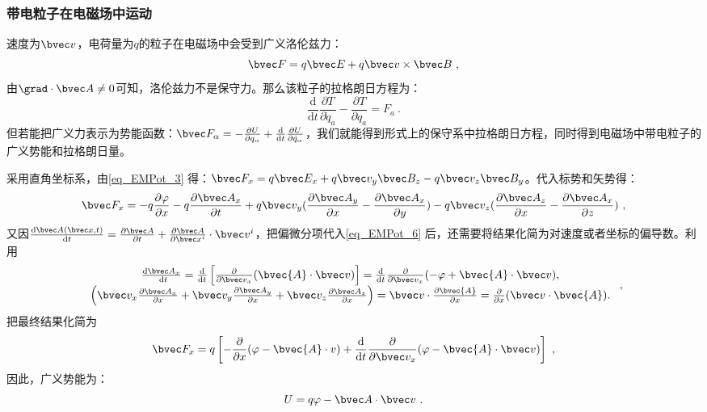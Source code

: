 \subsubsection{带电粒子在电磁场中运动}
速度为$\bvec v$，电荷量为$q$的粒子在电磁场中会受到广义洛伦兹力：
\begin{equation}\label{eq_EMPot_3}
\bvec F=q\bvec E+q\bvec v \times \bvec B
~,\end{equation}
由$\grad \cdot \bvec A\neq 0$可知，洛伦兹力不是保守力。那么该粒子的拉格朗日方程为：
\begin{equation}
\frac{\mathrm{d}}{\mathrm{d} t} \frac{\partial T}{\partial \dot{q}_a}-\frac{\partial T}{\partial q_a}=F_a~.
\end{equation}
但若能把广义力表示为势能函数：$\bvec F_{\alpha}=-\frac{\partial U}{\partial q_{\alpha}}+\frac{\mathrm{d}}{\mathrm{d}t}\frac{\partial U}{\partial \dot q_{\alpha}}$，我们就能得到形式上的保守系中拉格朗日方程，同时得到电磁场中带电粒子的广义势能和拉格朗日量。

采用直角坐标系，由\autoref{eq_EMPot_3} 得：$\bvec F_x=q\bvec E_x+q\bvec v_y\bvec B_z-q\bvec v_z\bvec B_y$。代入标势和矢势得：
\begin{equation}\label{eq_EMPot_6}
\bvec F_x=-q\frac{\partial \varphi}{\partial x}-q\frac{\partial \bvec A_x}{\partial t}+q\bvec v_y(\frac{\partial \bvec A_y}{\partial x}-\frac{\partial \bvec A_x}{\partial y})-q\bvec v_z(\frac{\partial \bvec A_z}{\partial x}-\frac{\partial \bvec A_x}{\partial z})~,
\end{equation}
又因$\frac{\mathrm{d}\bvec A(\bvec x,t)}{\mathrm{d}t}=\frac{\partial \bvec A}{\partial t}+\frac{\partial \bvec A}{\partial \bvec x^i}\cdot \bvec v^i$，把偏微分项代入\autoref{eq_EMPot_6} 后，还需要将结果化简为对速度或者坐标的偏导数。利用
\begin{equation}
\begin{array}{c}
\frac{\mathrm{d} \bvec A_x}{\mathrm{~d} t}=\frac{\mathrm{d}}{\mathrm{d} t}\left[\frac{\partial}{\partial \bvec v_x}(\bvec {A} \cdot \bvec v)\right]=\frac{\mathrm{d}}{\mathrm{d} t} \frac{\partial}{\partial \bvec v_x}(-\varphi+\bvec {A} \cdot \bvec v), \\
\left(\bvec v_x \frac{\partial \bvec A_x}{\partial x}+\bvec v_y \frac{\partial \bvec A_y}{\partial x}+\bvec v_z \frac{\partial \bvec A_z}{\partial x}\right)=\bvec v \cdot \frac{\partial \bvec {A}}{\partial x}=\frac{\partial}{\partial x}(\bvec v \cdot \bvec {A}) .
\end{array}~,
\end{equation}
把最终结果化简为
\begin{equation}
\bvec F_x=q\left[-\frac{\partial}{\partial x}(\varphi-\bvec {A} \cdot v)+\frac{\mathrm{d}}{\mathrm{d} t} \frac{\partial}{\partial \bvec v_x}(\varphi-\bvec {A} \cdot \bvec v)\right]~,
\end{equation}
因此，广义势能为：
\begin{equation}
U=q\varphi -\bvec A\cdot \bvec v~.
\end{equation}